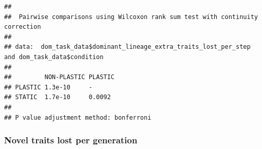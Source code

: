 \documentclass[]{book}
\newenvironment{Shaded}{\begin{snugshade}}{\end{snugshade}}
\newcommand{\DataTypeTok}[1]{\textcolor[rgb]{0.13,0.29,0.53}{#1}}
\newcommand{\FloatTok}[1]{\textcolor[rgb]{0.00,0.00,0.81}{#1}}
\newcommand{\KeywordTok}[1]{\textcolor[rgb]{0.13,0.29,0.53}{\textbf{#1}}}
\newcommand{\NormalTok}[1]{#1}
\newcommand{\OperatorTok}[1]{\textcolor[rgb]{0.81,0.36,0.00}{\textbf{#1}}}
\newcommand{\OtherTok}[1]{\textcolor[rgb]{0.56,0.35,0.01}{#1}}
\newcommand{\StringTok}[1]{\textcolor[rgb]{0.31,0.60,0.02}{#1}}
\begin{document}
\begin{Shaded}
\end{Shaded}

\begin{verbatim}
## 
##  Pairwise comparisons using Wilcoxon rank sum test with continuity correction 
## 
## data:  dom_task_data$dominant_lineage_extra_traits_lost_per_step and dom_task_data$condition 
## 
##         NON-PLASTIC PLASTIC
## PLASTIC 1.3e-10     -      
## STATIC  1.7e-10     0.0092 
## 
## P value adjustment method: bonferroni
\end{verbatim}

\hypertarget{novel-traits-lost-per-generation}{%
\subsubsection{Novel traits lost per generation}\label{novel-traits-lost-per-generation}}
\end{document}
